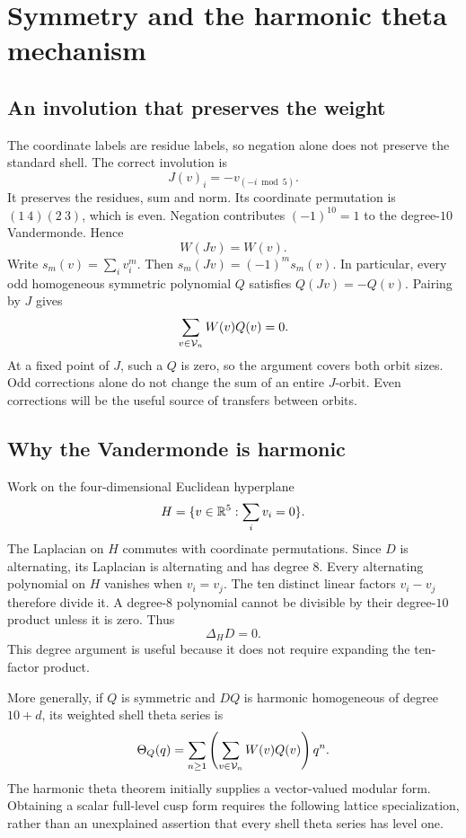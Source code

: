 \chapter{Symmetry and the harmonic theta mechanism}\label{ch:theta}
\section{An involution that preserves the weight}
The coordinate labels are residue labels, so negation alone does not preserve the standard shell. The correct involution is
\begin{equation}\label{eq:j}
J(v)_i=-v_{(-i\bmod5)}.
\end{equation}
It preserves the residues, sum and norm. Its coordinate permutation is $(1\ 4)(2\ 3)$, which is even. Negation contributes $(-1)^{10}=1$ to the degree-$10$ Vandermonde. Hence
\[
W(Jv)=W(v).
\]
Write $s_m(v)=\sum_i v_i^m$. Then $s_m(Jv)=(-1)^ms_m(v)$. In particular, every odd homogeneous symmetric polynomial $Q$ satisfies $Q(Jv)=-Q(v)$. Pairing by $J$ gives
\begin{equation}\label{eq:oddnull}
\sum_{v\in\mathcal V_n}W(v)Q(v)=0.
\end{equation}
At a fixed point of $J$, such a $Q$ is zero, so the argument covers both orbit sizes. Odd corrections alone do not change the sum of an entire $J$-orbit. Even corrections will be the useful source of transfers between orbits.

\section{Why the Vandermonde is harmonic}
Work on the four-dimensional Euclidean hyperplane
\[
H=\{v\in\mathbb R^5:\sum_i v_i=0\}.
\]
The Laplacian on $H$ commutes with coordinate permutations. Since $D$ is alternating, its Laplacian is alternating and has degree $8$. Every alternating polynomial on $H$ vanishes when $v_i=v_j$. The ten distinct linear factors $v_i-v_j$ therefore divide it. A degree-$8$ polynomial cannot be divisible by their degree-$10$ product unless it is zero. Thus
\[
\Delta_H D=0.
\]
This degree argument is useful because it does not require expanding the ten-factor product.

More generally, if $Q$ is symmetric and $DQ$ is harmonic homogeneous of degree $10+d$, its weighted shell theta series is
\begin{equation}\label{eq:thetaq}
\Theta_Q(q)=\sum_{n\ge1}\left(\sum_{v\in\mathcal V_n}W(v)Q(v)\right)q^n.
\end{equation}
The harmonic theta theorem initially supplies a vector-valued modular form. Obtaining a scalar full-level cusp form requires the following lattice specialization, rather than an unexplained assertion that every shell theta series has level one.

